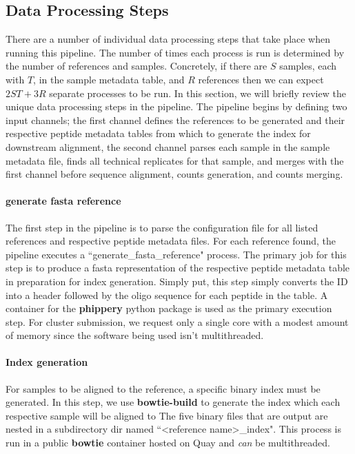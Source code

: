 \documentclass{article}
\begin{document}
\subsection*{Data Processing Steps}

There are a number of individual data processing steps that take place when running this pipeline.
The number of times each process is run is determined by the number of references and samples.
Concretely, if there are $S$ samples, each with $T$, in the sample metadata table, and $R$ references then we can expect $2ST + 3R$ separate processes to be run. 
In this section, we will briefly review the unique data processing steps in the pipeline.
The pipeline begins by defining two input channels; 
the first channel defines the references to be generated and their respective peptide metadata tables from which to generate the index for downstream alignment,
the second channel parses each sample in the sample metadata file, finds all technical replicates for that sample, and merges with the first channel before sequence
alignment, counts generation, and counts merging. 

\paragraph{generate fasta reference}
The first step in the pipeline is to parse the configuration file for all listed references and respective peptide metadata files. 
For each reference found, the pipeline executes a ``generate\_fasta\_reference" process.
The primary job for this step is to produce a fasta representation of the respective peptide metadata table in preparation for index generation.
Simply put, this step simply converts the ID into a header followed by the oligo sequence for each peptide in the table.
A container for the \textbf{phippery} python package is used as the primary execution step.
For cluster submission, we request only a single core with a modest amount of memory since the software being used isn't multithreaded.

\paragraph{Index generation}
For samples to be aligned to the reference, a specific binary index must be generated.
In this step, we use \textbf{bowtie-build} to generate the index which each respective sample will be aligned to \cite{Langmead2009}
The five binary files that are output are nested in a subdirectory dir named ``<reference name>\_index".
This process is run in a public \textbf{bowtie} container hosted on Quay and \textit{can} be multithreaded. 
\end{document}
